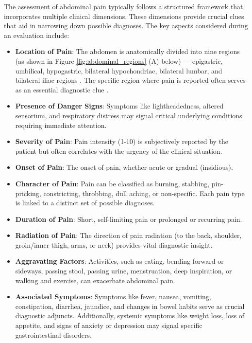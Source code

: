 \noindent The assessment of abdominal pain typically follows a structured framework that incorporates multiple clinical dimensions. These dimensions provide crucial clues that aid in narrowing down possible diagnoses. The key aspects considered during an evaluation include:
\begin{itemize}
    \item \textcolor{TUMRed}{\textbf{Location of Pain}}: The abdomen is anatomically divided into nine regions (as shown in Figure \ref{fig:abdominal_regions} (A) below) --- epigastric, umbilical, hypogastric, bilateral hypochondriac, bilateral lumbar, and bilateral iliac regions \cite{AbExm}. The specific region where pain is reported often serves as an essential diagnostic clue \cite{gans2015guideline}.
    \item \textcolor{TUMRed}{\textbf{Presence of Danger Signs}}: Symptoms like lightheadedness, altered sensorium, and respiratory distress may signal critical underlying conditions requiring immediate attention.
    \item \textcolor{TUMRed}{\textbf{Severity of Pain}}: Pain intensity (1-10) is subjectively reported by the patient but often correlates with the urgency of the clinical situation.
    \item \textcolor{TUMRed}{\textbf{Onset of Pain}}: The onset of pain, whether acute or gradual (insidious).
    \item \textcolor{TUMRed}{\textbf{Character of Pain}}: Pain can be classified as burning, stabbing, pin-pricking, constricting, throbbing, dull aching, or non-specific. Each pain type is linked to a distinct set of possible diagnoses.
    \item \textcolor{TUMRed}{\textbf{Duration of Pain}}: Short, self-limiting pain or prolonged or recurring pain.
    \item \textcolor{TUMRed}{\textbf{Radiation of Pain}}: The direction of pain radiation (to the back, shoulder, groin/inner thigh, arms, or neck) provides vital diagnostic insight.
    \item \textcolor{TUMRed}{\textbf{Aggravating Factors}}: Activities, such as eating, bending forward or sideways, passing stool, passing urine, menstruation, deep inspiration, or walking and exercise, can exacerbate abdominal pain.
    \item \textcolor{TUMRed}{\textbf{Associated Symptoms}}: Symptoms like fever, nausea, vomiting, constipation, diarrhea, jaundice, and changes in bowel habits serve as crucial diagnostic adjuncts. Additionally, systemic symptoms like weight loss, loss of appetite, and signs of anxiety or depression may signal specific gastrointestinal disorders.

\end{itemize}
